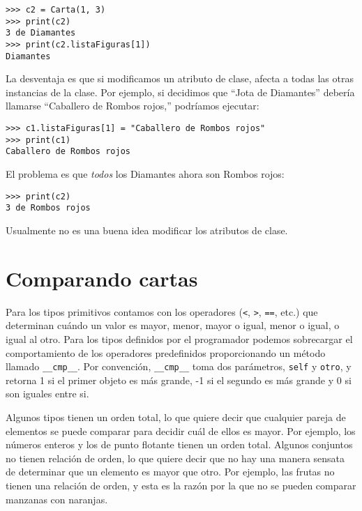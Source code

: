 \begin{verbatim}
>>> c2 = Carta(1, 3)
>>> print(c2)
3 de Diamantes
>>> print(c2.listaFiguras[1])
Diamantes
\end{verbatim}
 La desventaja es que si modificamos un atributo de clase, afecta
a todas las otras instancias de la clase. Por ejemplo, si decidimos
que ``Jota de Diamantes'' debería llamarse ``Caballero de Rombos
rojos,'' podríamos ejecutar:

 

\begin{verbatim}
>>> c1.listaFiguras[1] = "Caballero de Rombos rojos"
>>> print(c1)
Caballero de Rombos rojos
\end{verbatim}
 El problema es que {\em todos} los Diamantes ahora son Rombos
rojos:

\begin{verbatim}
>>> print(c2)
3 de Rombos rojos
\end{verbatim}
 Usualmente no es una buena idea modificar los atributos de clase.

\section{Comparando cartas}

\label{comparecard}  

Para los tipos primitivos contamos con los operadores (\texttt{<},
\texttt{>}, \texttt{==}, etc.) que determinan cuándo un valor es mayor,
menor, mayor o igual, menor o igual, o igual al otro. Para los tipos
definidos por el programador podemos sobrecargar el comportamiento
de los operadores predefinidos proporcionando un método llamado \texttt{\_\_cmp\_\_}.
Por convención, \texttt{\_\_cmp\_\_} toma dos parámetros, \texttt{self}
y \texttt{otro}, y retorna 1 si el primer objeto es más grande, -1
si el segundo es más grande y 0 si son iguales entre si.

  
 

Algunos tipos tienen un orden total, lo que quiere decir que cualquier
pareja de elementos se puede comparar para decidir cuál de ellos es
mayor. Por ejemplo, los números enteros y los de punto flotante tienen
un orden total. Algunos conjuntos no tienen relación de orden, lo
que quiere decir que no hay una manera sensata de determinar que un
elemento es mayor que otro. Por ejemplo, las frutas no tienen una
relación de orden, y esta es la razón por la que no se pueden comparar
manzanas con naranjas.

